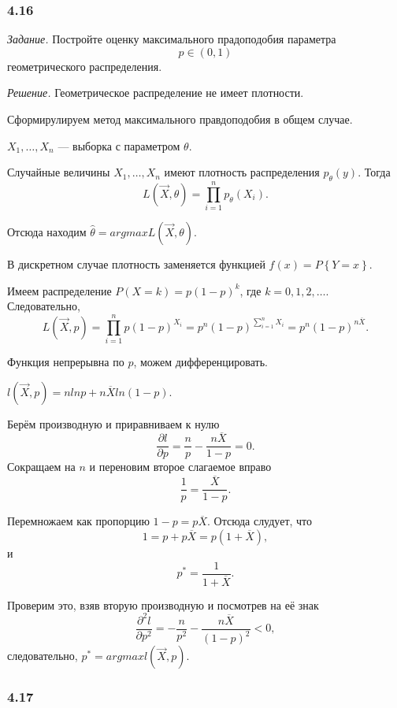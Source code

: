 \subsubsection*{4.16}

\textit{Задание.}
Постройте оценку максимального прадоподобия параметра
$$p \in
  \left(0, 1 \right) $$
геометрического распределения.

\textit{Решение.} Геометрическое распределение не имеет плотности.

Сформирулируем метод максимального правдоподобия в общем случае.

$X_1, \dotsc, X_n$ --- выборка с параметром $ \theta $.

Случайные величины $X_1, \dotsc, X_n$ имеют плотность распределения
$p_{ \theta } \left( y \right) $.
Тогда
$$L \left( \vec{X}, \theta \right) =
  \prod \limits_{i = 1}^n p_{ \theta } \left( X_i \right).$$

Отсюда находим $ \hat{ \theta } = argmax L \left( \vec{X}, \theta \right) $.

В дискретном случае плотность заменяется функцией $f \left( x \right) = P \left\{ Y = x \right\} $.

Имеем распределение $P \left( X = k \right) = p \left( 1 - p \right)^k$, где $k = 0, 1, 2, \dotsc $.
Следовательно,
$$L \left( \vec{X}, p \right) =
  \prod \limits_{i = 1}^n p \left( 1 - p \right)^{X_i} =
  p^n \left( 1 - p \right)^{ \sum \limits_{i = 1}^n X_i}  =
  p^n \left( 1 - p \right)^{n \overline{X}}.$$

Функция непрерывна по $p$, можем дифференцировать.

$l \left( \vec{X}, p \right) =
  nlnp + n \overline{X} ln \left( 1 - p \right) $.

Берём производную и приравниваем к нулю
$$ \frac{ \partial l}{ \partial p} =
  \frac{n}{p} - \frac{n \overline{X} }{1 - p} =
  0.$$
Сокращаем на $n$ и переновим второе слагаемое вправо
$$ \frac{1}{p} =
  \frac{ \overline{X}}{1 - p}.$$

Перемножаем как пропорцию $1 - p = p \overline{X}$.
Отсюда слудует, что
$$1 =
  p + p \overline{X} =
  p \left( 1 + \overline{X} \right),$$
и
$$p^* =
  \frac{1}{1 + \overline{X}}.$$

Проверим это, взяв вторую производную и посмотрев на её знак
$$ \frac{ \partial^2 l}{ \partial p^2} =
  - \frac{n}{p^2} - \frac{n \overline{X}}{ \left( 1 - p \right)^2} <
  0,$$
следовательно, $p^* = argmax l \left( \vec{X}, p \right) $.

\subsubsection*{4.17}

